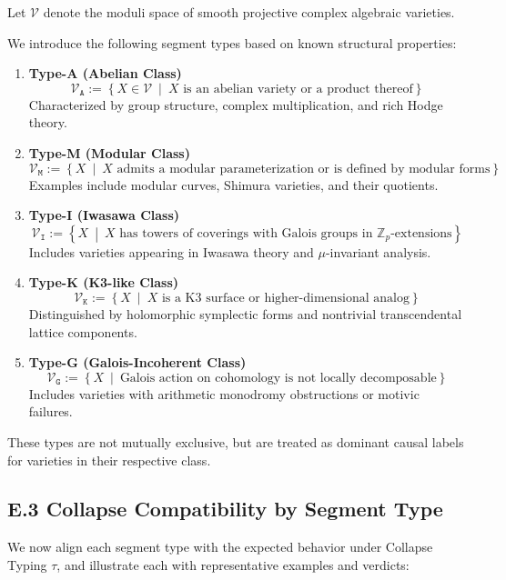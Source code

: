 \documentclass[11pt]{article}
\begin{document}
Let $\mathcal{V}$ denote the moduli space of smooth projective complex algebraic varieties.

We introduce the following segment types based on known structural properties:

\begin{enumerate}
  \item \textbf{Type-A (Abelian Class)}  
    \[
    \mathcal{V}_{\texttt{A}} := \left\{ X \in \mathcal{V} \ \middle| \ X \text{ is an abelian variety or a product thereof} \right\}
    \]
    Characterized by group structure, complex multiplication, and rich Hodge theory.
    
  \item \textbf{Type-M (Modular Class)}  
    \[
    \mathcal{V}_{\texttt{M}} := \left\{ X \ \middle| \ X \text{ admits a modular parameterization or is defined by modular forms} \right\}
    \]
    Examples include modular curves, Shimura varieties, and their quotients.

  \item \textbf{Type-I (Iwasawa Class)}  
    \[
    \mathcal{V}_{\texttt{I}} := \left\{ X \ \middle| \ X \text{ has towers of coverings with Galois groups in } \mathbb{Z}_p \text{-extensions} \right\}
    \]
    Includes varieties appearing in Iwasawa theory and $\mu$-invariant analysis.

  \item \textbf{Type-K (K3-like Class)}  
    \[
    \mathcal{V}_{\texttt{K}} := \left\{ X \ \middle| \ X \text{ is a K3 surface or higher-dimensional analog} \right\}
    \]
    Distinguished by holomorphic symplectic forms and nontrivial transcendental lattice components.

  \item \textbf{Type-G (Galois-Incoherent Class)}  
    \[
    \mathcal{V}_{\texttt{G}} := \left\{ X \ \middle| \ \text{Galois action on cohomology is not locally decomposable} \right\}
    \]
    Includes varieties with arithmetic monodromy obstructions or motivic failures.
\end{enumerate}

These types are not mutually exclusive, but are treated as dominant causal labels for varieties in their respective class.

\subsection*{E.3 Collapse Compatibility by Segment Type}

We now align each segment type with the expected behavior under Collapse Typing $\tau$, and illustrate each with representative examples and verdicts:
\end{document}
